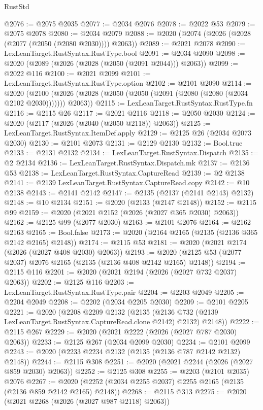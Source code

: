 \begin{lexlean}{RustStd}
\begin{coremodule}
@2076 := @2075 @2035
@2077 := @2034 @2076
@2078 := @2022 @53
@2079 := @2075 @2078
@2080 := @2034 @2079
@2088 := @2020 (@2074 (@2026 (@2028 (@2077 (@2050 (@2080 @2030)))) @2063))
@2089 := @2021 @2078
@2090 := LexLeanTarget.RustSyntax.RustType.bool
@2091 := @2034 @2090
@2098 := @2020 (@2089 (@2026 (@2028 (@2050 (@2091 @2044))) @2063))
@2099 := @2022 @116
@2100 := @2021 @2099
@2101 := LexLeanTarget.RustSyntax.RustType.option
@2102 := @2101 @2090
@2114 := @2020
    (@2100 (@2026 (@2028 (@2050 (@2050 (@2091 (@2080 (@2080 (@2034 @2102 @2030))))))) @2063))
@2115 := LexLeanTarget.RustSyntax.RustType.fn
@2116 := @2115 @26
@2117 := @2021 @2116
@2118 := @2050 @2030
@2124 := @2020 (@2117 (@2026 (@2040 (@2050 @2118)) @2063))
@2125 := LexLeanTarget.RustSyntax.ItemDef.apply
@2129 := @2125 @26 (@2034 @2073 @2030)
@2130 := @2101 @2073
@2131 := @2129 @2130
@2132 := Bool.true
@2133 := @2131 @2132
@2134 := LexLeanTarget.RustSyntax.Dispatch
@2135 := @2 @2134
@2136 := LexLeanTarget.RustSyntax.Dispatch.mk
@2137 := @2136 @53
@2138 := LexLeanTarget.RustSyntax.CaptureRead
@2139 := @2 @2138
@2141 := @2139 LexLeanTarget.RustSyntax.CaptureRead.copy
@2142 := @10 @2138
@2143 := @2141 @2142
@2147 := @2135 (@2137 (@2141 @2143) @2132)
@2148 := @10 @2134
@2151 := @2020 (@2133 (@2147 @2148))
@2152 := @2115 @99
@2159 := @2020 (@2021 @2152 (@2026 (@2027 @365 @2030) @2063))
@2162 := @2125 @99 (@2077 @2030)
@2163 := @2101 @2076
@2164 := @2162 @2163
@2165 := Bool.false
@2173 := @2020 (@2164 @2165 (@2135 (@2136 @365 @2142 @2165) @2148))
@2174 := @2115 @53
@2181 := @2020 (@2021 @2174 (@2026 (@2027 @408 @2030) @2063))
@2193 := @2020 (@2125 @53 (@2077 @2037) @2076 @2165 (@2135 (@2136 @408 @2142 @2165) @2148))
@2194 := @2115 @116
@2201 := @2020 (@2021 @2194 (@2026 (@2027 @732 @2037) @2063))
@2202 := @2125 @116
@2203 := LexLeanTarget.RustSyntax.RustType.pair
@2204 := @2203 @2049
@2205 := @2204 @2049
@2208 := @2202 (@2034 @2205 @2030)
@2209 := @2101 @2205
@2221 := @2020
    (@2208
      @2209
      @2132
      (@2135 (@2136 @732 (@2139 LexLeanTarget.RustSyntax.CaptureRead.clone @2142) @2132) @2148))
@2222 := @2115 @267
@2229 := @2020 (@2021 @2222 (@2026 (@2027 @787 @2030) @2063))
@2233 := @2125 @267 (@2034 @2099 @2030)
@2234 := @2101 @2099
@2243 := @2020 (@2233 @2234 @2132 (@2135 (@2136 @787 @2142 @2132) @2148))
@2244 := @2115 @308
@2251 := @2020 (@2021 @2244 (@2026 (@2027 @859 @2030) @2063))
@2252 := @2125 @308
@2255 := @2203 (@2101 @2035) @2076
@2267 := @2020 (@2252 (@2034 @2255 @2037) @2255 @2165 (@2135 (@2136 @859 @2142 @2165) @2148))
@2268 := @2115 @313
@2275 := @2020 (@2021 @2268 (@2026 (@2027 @987 @2118) @2063))

\end{coremodule}
\end{lexlean}
